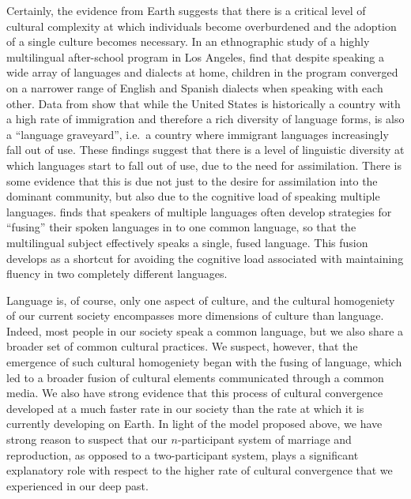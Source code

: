 Certainly, the evidence from Earth suggests that there is a critical level of cultural complexity at which individuals become overburdened and the adoption of a single culture becomes necessary. In an ethnographic study of a highly multilingual after-school program in Los Angeles, \cite{orellana2016cultivating} find that despite speaking a wide array of languages and dialects at home, children in the program converged on a narrower range of English and Spanish dialects when speaking with each other. Data from \cite{rumbaut2013immigration} show that while the United States is historically a country with a high rate of immigration and therefore a rich diversity of language forms, is also a ``language graveyard'', i.e.\ a country where immigrant languages increasingly fall out of use. These findings suggest that there is a level of linguistic diversity at which languages start to fall out of use, due to the need for assimilation. There is some evidence that this is due not just to the desire for assimilation into the dominant community, but also due to the cognitive load of speaking multiple languages. \cite{matras2000fusion}
finds that speakers of multiple languages often develop strategies for ``fusing'' their spoken languages in to one common language, so that the multilingual subject effectively speaks a single, fused language. This fusion develops as a shortcut for avoiding the cognitive load associated with maintaining fluency in two completely different languages.\par 

Language is, of course, only one aspect of culture, and the cultural homogeniety of our current society encompasses more dimensions of culture than language. Indeed, most people in our society speak a common language, but we also share a broader set of common cultural practices. We suspect, however, that the emergence of such cultural homogeniety began with the fusing of language, which led to a broader fusion of cultural elements communicated through a common media. We also have strong evidence that this process of cultural convergence developed at a much faster rate in our society than the rate at which it is currently developing on Earth. In light of the model proposed above, we have strong reason to suspect that our $n$-participant system of marriage and reproduction, as opposed to a two-participant system, plays a significant explanatory role with respect to the higher rate of cultural convergence that we experienced in our deep past.\par 
